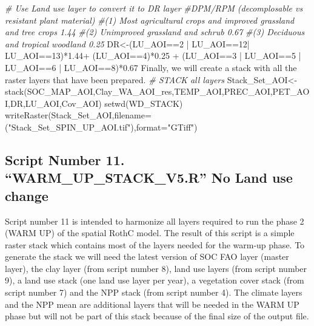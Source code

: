 \documentclass[
  10pt,
  b5paper,
]{book}
\newenvironment{Shaded}{\begin{snugshade}}{\end{snugshade}}
\newcommand{\AttributeTok}[1]{\textcolor[rgb]{0.77,0.63,0.00}{#1}}
\newcommand{\CommentTok}[1]{\textcolor[rgb]{0.56,0.35,0.01}{\textit{#1}}}
\newcommand{\DecValTok}[1]{\textcolor[rgb]{0.00,0.00,0.81}{#1}}
\newcommand{\FloatTok}[1]{\textcolor[rgb]{0.00,0.00,0.81}{#1}}
\newcommand{\FunctionTok}[1]{\textcolor[rgb]{0.00,0.00,0.00}{#1}}
\newcommand{\NormalTok}[1]{#1}
\newcommand{\OtherTok}[1]{\textcolor[rgb]{0.56,0.35,0.01}{#1}}
\newcommand{\SpecialCharTok}[1]{\textcolor[rgb]{0.00,0.00,0.00}{#1}}
\newcommand{\StringTok}[1]{\textcolor[rgb]{0.31,0.60,0.02}{#1}}
\begin{document}
\begin{Shaded}
\begin{Highlighting}[]
\CommentTok{\# Use Land use layer to convert it to DR layer }
\CommentTok{\#DPM/RPM (decomplosable vs resistant plant material)}
\CommentTok{\#(1) Most agricultural crops and improved grassland and tree crops 1.44 }
\CommentTok{\#(2) Unimproved grassland and schrub 0.67}
\CommentTok{\#(3) Deciduous and tropical woodland 0.25    }
\NormalTok{DR}\OtherTok{\textless{}{-}}\NormalTok{(LU\_AOI}\SpecialCharTok{==}\DecValTok{2} \SpecialCharTok{|}\NormalTok{ LU\_AOI}\SpecialCharTok{==}\DecValTok{12}\SpecialCharTok{|}\NormalTok{ LU\_AOI}\SpecialCharTok{==}\DecValTok{13}\NormalTok{)}\SpecialCharTok{*}\FloatTok{1.44}\SpecialCharTok{+}\NormalTok{ (LU\_AOI}\SpecialCharTok{==}\DecValTok{4}\NormalTok{)}\SpecialCharTok{*}\FloatTok{0.25} \SpecialCharTok{+}\NormalTok{ (LU\_AOI}\SpecialCharTok{==}\DecValTok{3} \SpecialCharTok{|}\NormalTok{ LU\_AOI}\SpecialCharTok{==}\DecValTok{5} \SpecialCharTok{|}\NormalTok{ LU\_AOI}\SpecialCharTok{==}\DecValTok{6} \SpecialCharTok{|}\NormalTok{ LU\_AOI}\SpecialCharTok{==}\DecValTok{8}\NormalTok{)}\SpecialCharTok{*}\FloatTok{0.67}
\NormalTok{ Finally, we will create a stack with all the raster layers that have been prepared.}
 \CommentTok{\# STACK all layers}
\NormalTok{Stack\_Set\_AOI}\OtherTok{\textless{}{-}}\FunctionTok{stack}\NormalTok{(SOC\_MAP\_AOI,Clay\_WA\_AOI\_res,TEMP\_AOI,PREC\_AOI,PET\_AOI,DR,LU\_AOI,Cov\_AOI)}
\FunctionTok{setwd}\NormalTok{(WD\_STACK)}
\FunctionTok{writeRaster}\NormalTok{(Stack\_Set\_AOI,}\AttributeTok{filename=}\NormalTok{(}\StringTok{"Stack\_Set\_SPIN\_UP\_AOI.tif"}\NormalTok{),}\AttributeTok{format=}\StringTok{"GTiff"}\NormalTok{)}
\end{Highlighting}
\end{Shaded}

\hypertarget{script-number-11.-warm_up_stack_v5.r-no-land-use-change}{%
\subsection{Script Number 11. ``WARM\_UP\_STACK\_V5.R'' No Land use change}\label{script-number-11.-warm_up_stack_v5.r-no-land-use-change}}

Script number 11 is intended to harmonize all layers required to run the phase 2 (WARM UP) of the spatial RothC model. The result of this script is a simple raster stack which contains most of the layers needed for the warm-up phase. To generate the stack we will need the latest version of SOC FAO layer (master layer), the clay layer (from script number 8), land use layers (from script number 9), a land use stack (one land use layer per year), a vegetation cover stack (from script number 7) and the NPP stack (from script number 4). The climate layers and the NPP mean are additional layers that will be needed in the WARM UP phase but will not be part of this stack because of the final size of the output file.
\end{document}
